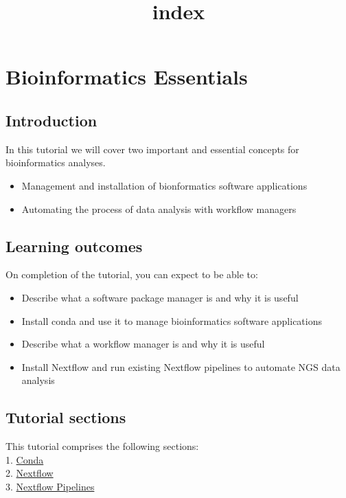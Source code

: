 \documentclass[11pt]{article}
\title{index}
\providecommand{\tightlist}{%
      \setlength{\itemsep}{0pt}\setlength{\parskip}{0pt}}
\begin{document}
    \hypertarget{bioinformatics-essentials}{%
\section{Bioinformatics Essentials}\label{bioinformatics-essentials}}

\hypertarget{introduction}{%
\subsection{Introduction}\label{introduction}}

In this tutorial we will cover two important and essential concepts for
bioinformatics analyses.

\begin{itemize}
\tightlist
\item
  Management and installation of bionformatics software applications
\item
  Automating the process of data analysis with workflow managers
\end{itemize}

\hypertarget{learning-outcomes}{%
\subsection{Learning outcomes}\label{learning-outcomes}}

On completion of the tutorial, you can expect to be able to:

\begin{itemize}
\tightlist
\item
  Describe what a software package manager is and why it is useful\\
\item
  Install conda and use it to manage bioinformatics software
  applications
\item
  Describe what a workflow manager is and why it is useful
\item
  Install Nextflow and run existing Nextflow pipelines to automate NGS
  data analysis
\end{itemize}

\hypertarget{tutorial-sections}{%
\subsection{Tutorial sections}\label{tutorial-sections}}

This tutorial comprises the following sections:\\
1. \href{conda.ipynb}{Conda}\\
2. \href{nextflow.ipynb}{Nextflow}\\
3. \href{nf_pipelines.ipynb}{Nextflow Pipelines}
\end{document}
